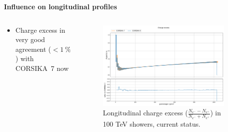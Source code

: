 \documentclass[aspectratio=1610, 9pt]{beamer}
\begin{document}
\begin{frame}

  \textbf{Influence on longitudinal profiles}
  \vspace{5mm}

    \begin{columns}[onlytextwidth]
        \begin{column}{0.4\textwidth}
            \begin{itemize}
              \item Charge excess in very good agreement ($< \SI{1}{\percent}$) with CORSIKA~7 now
            \end{itemize}
        \end{column}
        \begin{column}{0.6\textwidth}
            \begin{figure}
                \centering
                \includegraphics[width=0.95\textwidth]{plots/charge_excess_2023.png}
                \caption{Longitudinal charge excess ($\frac{N_{e^-} - N_{e^+}}{N_{e^-} + N_{e^+}}$) in 100 \si{\tera\electronvolt} showers, current status.}
            \end{figure}
        \end{column}
    \end{columns}
\end{frame}
\end{document}
